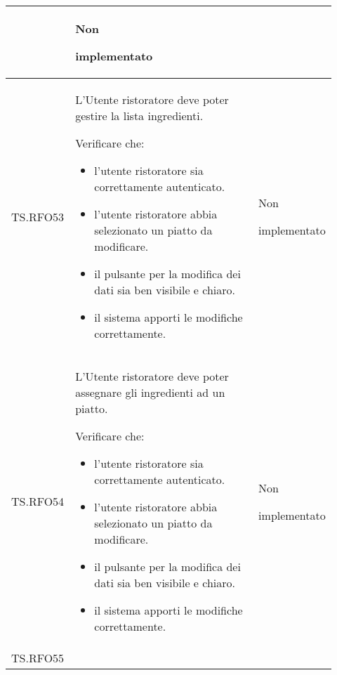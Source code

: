 \begin{longtable}{|p{0.10\linewidth}|p{0.70\linewidth}|p{0.12\linewidth}|}
\begin{itemize}
	\end{itemize}                                                    &
	Non \par implementato                                                                                                                                                   \\
	\hline
	TS.RFO53                                                                                                                        &
	L’Utente ristoratore deve poter gestire la lista ingredienti. \par
	Verificare che:
	\begin{itemize}
		\item l'utente ristoratore sia correttamente autenticato.
		\item l'utente ristoratore abbia selezionato un piatto da modificare.
		\item il pulsante per la modifica dei dati sia ben visibile e chiaro.
		\item il sistema apporti le modifiche correttamente.
	\end{itemize}                                                           &
	Non \par implementato                                                                                                                                                   \\
	\hline
	TS.RFO54                                                                                                                        &
	L’Utente ristoratore deve poter assegnare gli ingredienti ad un piatto. \par
	Verificare che:
	\begin{itemize}
		\item l'utente ristoratore sia correttamente autenticato.
		\item l'utente ristoratore abbia selezionato un piatto da modificare.
		\item il pulsante per la modifica dei dati sia ben visibile e chiaro.
		\item il sistema apporti le modifiche correttamente.
	\end{itemize}                                                           &
	Non \par implementato                                                                                                                                                   \\
	\hline
	TS.RFO55                                                                                                                        &

\end{longtable}
